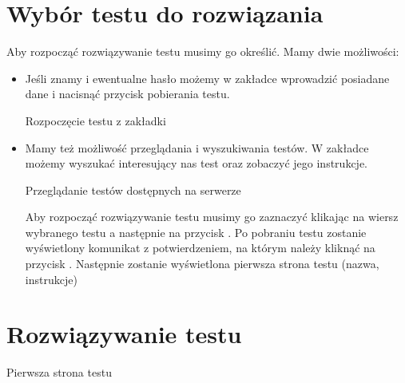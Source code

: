 \documentclass[letterpaper,10pt,polish]{sphinxmanual}
\begin{document}
\section{Wybór testu do rozwiązania}
\label{index:wybor-testu-do-rozwiazania}
Aby rozpocząć rozwiązywanie testu musimy go określić. Mamy dwie możliwości:
\begin{itemize}
\item {} 
Jeśli znamy  i ewentualne hasło możemy w zakładce  wprowadzić posiadane dane i nacisnąć przycisk pobierania testu.

Rozpoczęcie testu z zakładki 


\item {} 
Mamy też możliwość przeglądania i wyszukiwania testów. W zakładce  możemy wyszukać interesujący nas test oraz zobaczyć jego instrukcje.

Przeglądanie testów dostępnych na serwerze


Aby rozpocząć rozwiązywanie testu musimy go zaznaczyć klikając na wiersz wybranego testu a następnie na przycisk . Po pobraniu testu zostanie wyświetlony komunikat z potwierdzeniem, na którym należy kliknąć na przycisk . Następnie zostanie wyświetlona pierwsza strona testu (nazwa, instrukcje)

\end{itemize}


\section{Rozwiązywanie testu}
\label{index:rozwiazywanie-testu}
Pierwsza strona testu
\end{document}
